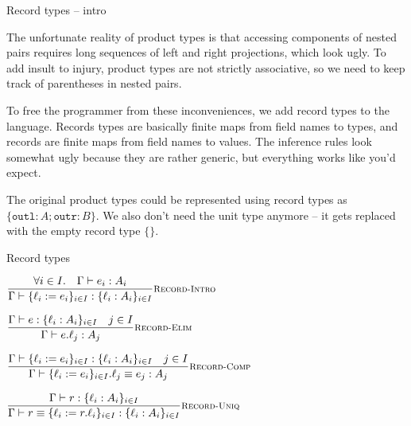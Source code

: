 \documentclass{beamer}
\begin{document}
\newcommand{\recordtypes}[4]{\recordtype{#1_{#3} : #2_{#3}}_{#3 \in #4}}
\newcommand{\records}[4]{\record{#1_{#3} := #2_{#3}}_{#3 \in #4}}
\newcommand{\proj}[2]{#2.#1}

\newcommand{\recordtype}[1]{\{#1\}}
\newcommand{\record}[1]{\{#1\}}

\begin{frame}{Record types -- intro}

The unfortunate reality of product types is that accessing components of nested pairs requires long sequences of left and right projections, which look ugly. To add insult to injury, product types are not strictly associative, so we need to keep track of parentheses in nested pairs.

\vspace{1em}

To free the programmer from these inconveniences, we add record types to the language. Records types are basically finite maps from field names to types, and records are finite maps from field names to values. The inference rules look somewhat ugly because they are rather generic, but everything works like you'd expect.

\vspace{1em}

The original product types could be represented using record types as $\recordtype{\texttt{outl} : A; \texttt{outr} : B}$. We also don't need the unit type anymore -- it gets replaced with the empty record type $\recordtype{}$.

\end{frame}

\begin{frame}{Record types}

\begin{center}
  $\infrule[Record-Intro]{\forall i \in I. \quad \typing{e_i}{A_i}}{\typing{\records{\ell}{e}{i}{I}}{\recordtypes{\ell}{A}{i}{I}}}$

  \vspace{2em}

  $\infrule[Record-Elim]{\typing{e}{\recordtypes{\ell}{A}{i}{I}} \quad \sidecond{j \in I}}{\typing{\proj{\ell_j}{e}}{A_j}}$

  \vspace{2em}

  $\infrule[Record-Comp]{\typing{\records{\ell}{e}{i}{I}}{\recordtypes{\ell}{A}{i}{I}} \quad \sidecond{j \in I}}{\compeq{\proj{\ell_j}{\records{\ell}{e}{i}{I}}}{e_j}{A_j}}$

  \vspace{2em}

  $\infrule[Record-Uniq]{\typing{r}{\recordtypes{\ell}{A}{i}{I}}}{\compeq{r}{\records{\ell}{\proj{\ell}{r}}{i}{I}}{\recordtypes{\ell}{A}{i}{I}}}$
\end{center}

\end{frame}
\end{document}
